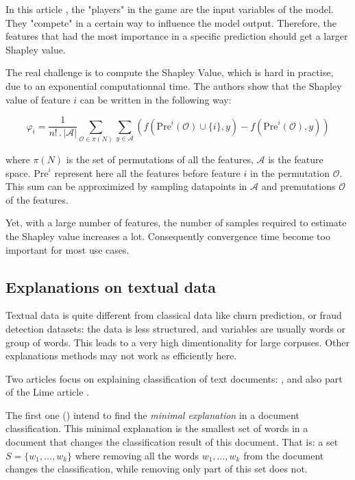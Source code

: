 \documentclass[a4paper,11pt]{kth-mag}
\begin{document}
In this article \cite{gametheory}, the "players" in the game are the input variables of the model. They "compete" in a certain way to influence the model output. Therefore, the features that had the most importance in a specific prediction should get a larger Shapley value.

The real challenge is to compute the Shapley Value, which is hard in practise, due to an exponential computationnal time. The authors show that the Shapley value of feature $i$ can be written in the following way:

\[
	\varphi_i = \frac1{n! \, . \, | \mathcal{A} |} \sum_{\mathcal{O} \in \pi(N)} \sum_{y \in \mathcal{A}} \left( f( \mathrm{Pre}^i(\mathcal{O}) \cup \{i\}, y) - f(\mathrm{Pre}^i(\mathcal{O}), y) \right)
\]

where $\pi(N)$ is the set of permutations of all the features, $\mathcal{A}$ is the feature space. $\mathrm{Pre}^i$ represent here all the features before feature $i$ in the permutation $\mathcal{O}$. This sum can be approximized by sampling datapoints in $\mathcal{A}$ and premutations $\mathcal{O}$ of the features.

Yet, with a large number of features, the number of samples required to estimate the Shapley value increases a lot. Consequently convergence time become too important for most use cases.

\subsection{Explanations on textual data}

Textual data is quite different from classical data like churn prediction, or fraud detection datasets: the data is less structured, and variables are usually words or group of words. This leads to a very high dimentionality for large corpuses. Other explanations methods may not work as efficiently here.

Two articles focus on explaining classification of text documents:  \cite{documentclassif}, and also part of the Lime article \cite{lime}.

The first one (\cite{documentclassif}) intend to find the \textit{minimal explanation} in a document classification. This minimal explanation is the smallest set of words in a document that changes the classification result of this document. That is: a set $S = \{w_1, ..., w_k\}$ where removing all the words $w_1, ..., w_k$ from the document changes the classification, while removing only part of this set does not.
\end{document}
